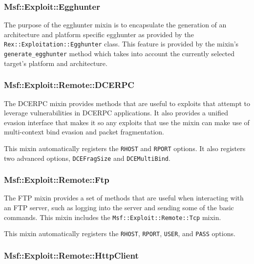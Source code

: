 \documentclass{report}
\begin{document}
            \subsubsection{Msf::Exploit::Egghunter}

\par
The purpose of the egghunter mixin is to encapsulate the generation
of an architecture and platform specific egghunter as provided by
the \texttt{Rex::Exploitation::Egghunter} class.  This feature is
provided by the mixin's \texttt{generate\_egghunter} method which
takes into account the currently selected target's platform and
architecture.

            \subsubsection{Msf::Exploit::Remote::DCERPC}

\par
The DCERPC mixin provides methods that are useful to exploits that
attempt to leverage vulnerabilities in DCERPC applications.  It also
provides a unified evasion interface that makes it so any exploits
that use the mixin can make use of multi-context bind evasion and
packet fragmentation.

\par
This mixin automatically registers the \texttt{RHOST} and
\texttt{RPORT} options.  It also registers two advanced options,
\texttt{DCEFragSize} and \texttt{DCEMultiBind}.

            \subsubsection{Msf::Exploit::Remote::Ftp}

\par
The FTP mixin provides a set of methods that are useful when
interacting with an FTP server, such as logging into the server and
sending some of the basic commands.  This mixin includes the
\texttt{Msf::Exploit::Remote::Tcp} mixin.

\par
This mixin automatically registers the \texttt{RHOST},
\texttt{RPORT}, \texttt{USER}, and \texttt{PASS} options.

            \subsubsection{Msf::Exploit::Remote::HttpClient}
\end{document}

